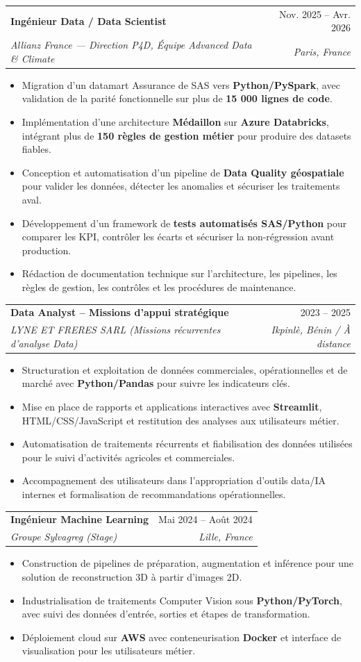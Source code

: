 \documentclass[letterpaper,11pt]{article}
\makeatletter
\newcommand{\resumeItem}[1]{
  \item\small{{#1 \vspace{-1.5pt}}}
}
\newcommand{\resumeSubheading}[4]{
  \vspace{1pt}\item
    \begin{tabular*}{0.97\textwidth}[t]{l@{\extracolsep{\fill}}r}
      {\color{primary}\textbf{#1}} & #2 \\
      \textit{\small#3} & \textit{\small #4} \\
    \end{tabular*}\vspace{-4pt}
}
\newcommand{\resumeItemListStart}{\begin{itemize}[leftmargin=0.15in, label={\small\textbullet}, itemsep=1.5pt, parsep=0pt, topsep=2pt, partopsep=0pt]}
\newcommand{\resumeItemListEnd}{\end{itemize}\vspace{-1pt}}
\makeatother
\begin{document}
\resumeSubheading
{Ingénieur Data / Data Scientist}{Nov. 2025 -- Avr. 2026}
{Allianz France --- Direction P4D, Équipe Advanced Data \& Climate}{Paris, France}
\resumeItemListStart
  \resumeItem{Migration d'un datamart Assurance de SAS vers \textbf{Python/PySpark}, avec validation de la parité fonctionnelle sur plus de \textbf{15 000 lignes de code}.}
  \resumeItem{Implémentation d'une architecture \textbf{Médaillon} sur \textbf{Azure Databricks}, intégrant plus de \textbf{150 règles de gestion métier} pour produire des datasets fiables.}
  \resumeItem{Conception et automatisation d'un pipeline de \textbf{Data Quality géospatiale} pour valider les données, détecter les anomalies et sécuriser les traitements aval.}
  \resumeItem{Développement d'un framework de \textbf{tests automatisés SAS/Python} pour comparer les KPI, contrôler les écarts et sécuriser la non-régression avant production.}
  \resumeItem{Rédaction de documentation technique sur l'architecture, les pipelines, les règles de gestion, les contrôles et les procédures de maintenance.}
\resumeItemListEnd

\resumeSubheading
{Data Analyst -- Missions d'appui stratégique}{2023 -- 2025}
{LYNE ET FRERES SARL \normalfont\small(Missions récurrentes d'analyse Data)}{Ikpinlè, Bénin / À distance}
\resumeItemListStart
  \resumeItem{Structuration et exploitation de données commerciales, opérationnelles et de marché avec \textbf{Python/Pandas} pour suivre les indicateurs clés.}
  \resumeItem{Mise en place de rapports et applications interactives avec \textbf{Streamlit}, HTML/CSS/JavaScript et restitution des analyses aux utilisateurs métier.}
  \resumeItem{Automatisation de traitements récurrents et fiabilisation des données utilisées pour le suivi d'activités agricoles et commerciales.}
  \resumeItem{Accompagnement des utilisateurs dans l'appropriation d'outils data/IA internes et formalisation de recommandations opérationnelles.}
\resumeItemListEnd

\resumeSubheading
{Ingénieur Machine Learning}{Mai 2024 -- Août 2024}
{Groupe Sylvagreg \normalfont\small(Stage)}{Lille, France}
\resumeItemListStart
  \resumeItem{Construction de pipelines de préparation, augmentation et inférence pour une solution de reconstruction 3D à partir d'images 2D.}
  \resumeItem{Industrialisation de traitements Computer Vision sous \textbf{Python/PyTorch}, avec suivi des données d'entrée, sorties et étapes de transformation.}
  \resumeItem{Déploiement cloud sur \textbf{AWS} avec conteneurisation \textbf{Docker} et interface de visualisation pour les utilisateurs métier.}
\resumeItemListEnd
\end{document}
